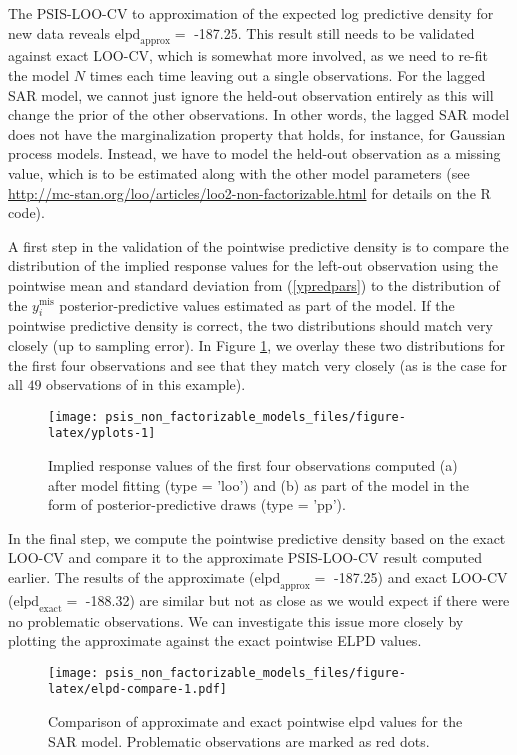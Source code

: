 \documentclass[english,,doc,floatsintext]{apa6}
\theoremstyle{definition}
\theoremstyle{definition}
\theoremstyle{definition}
\theoremstyle{remark}
\begin{document}
The PSIS-LOO-CV to approximation of the expected log predictive density
for new data reveals \(\text{elpd}_{\text{approx}} =\) -187.25. This
result still needs to be validated against exact LOO-CV, which is
somewhat more involved, as we need to re-fit the model \(N\) times each
time leaving out a single observations. For the lagged SAR model, we
cannot just ignore the held-out observation entirely as this will change
the prior of the other observations. In other words, the lagged SAR
model does not have the marginalization property that holds, for
instance, for Gaussian process models. Instead, we have to model the
held-out observation as a missing value, which is to be estimated along
with the other model parameters (see
\url{http://mc-stan.org/loo/articles/loo2-non-factorizable.html} for
details on the R code).

A first step in the validation of the pointwise predictive density is to
compare the distribution of the implied response values for the left-out
observation using the pointwise mean and standard deviation from
(\ref{ypredpars}) to the distribution of the \(y_i^{\mathrm{mis}}\)
posterior-predictive values estimated as part of the model. If the
pointwise predictive density is correct, the two distributions should
match very closely (up to sampling error). In Figure \ref{fig:yplots},
we overlay these two distributions for the first four observations and
see that they match very closely (as is the case for all \(49\)
observations of in this example).

\begin{figure}
\texttt{[image: psis\_non\_factorizable\_models\_files/figure-latex/yplots-1]} \caption{Implied response values of the first four observations computed (a) after model fitting (type = 'loo') and (b) as part of the model in the form of posterior-predictive draws (type = 'pp').}\label{fig:yplots}
\end{figure}

In the final step, we compute the pointwise predictive density based on
the exact LOO-CV and compare it to the approximate PSIS-LOO-CV result
computed earlier. The results of the approximate
(\(\text{elpd}_{\text{approx}} =\) -187.25) and exact LOO-CV
(\(\text{elpd}_{\text{exact}} =\) -188.32) are similar but not as close
as we would expect if there were no problematic observations. We can
investigate this issue more closely by plotting the approximate against
the exact pointwise ELPD values.

\begin{figure}
\centering
\texttt{[image: psis\_non\_factorizable\_models\_files/figure-latex/elpd-compare-1.pdf]}
\caption{\label{fig:elpd-compare}Comparison of approximate and exact
pointwise elpd values for the SAR model. Problematic observations are
marked as red dots.}
\end{figure}
\end{document}
